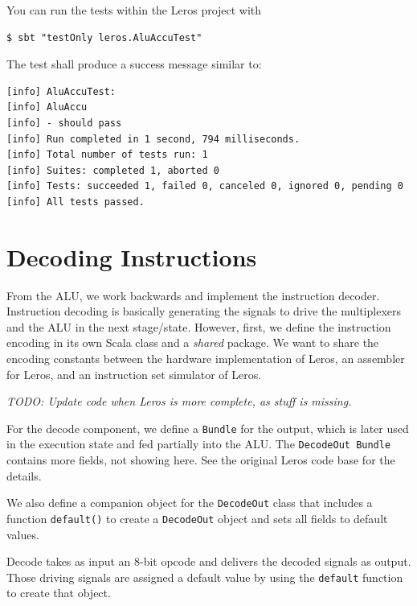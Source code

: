 \documentclass[%
    10pt,
    headinclude, footexclude,
    openright, %
    notitlepage,
    cleardoubleempty,
    headsepline,
    pointlessnumbers,
    bibtotoc, idxtotoc,
    ]{scrbook}
\newcommand{\code}[1]{{\lstinline[basicstyle=\small\ttfamily]{#1}}}
\newcommand{\todo}[1]{{\emph{TODO: #1}}}
\begin{document}

\noindent You can run the tests within the Leros project with

\begin{verbatim}
$ sbt "testOnly leros.AluAccuTest"
\end{verbatim}

The test shall produce a success message similar to:

\begin{verbatim}
[info] AluAccuTest:
[info] AluAccu
[info] - should pass
[info] Run completed in 1 second, 794 milliseconds.
[info] Total number of tests run: 1
[info] Suites: completed 1, aborted 0
[info] Tests: succeeded 1, failed 0, canceled 0, ignored 0, pending 0
[info] All tests passed.
\end{verbatim}

\section{Decoding Instructions}


From the ALU, we work backwards and implement the instruction decoder.
Instruction decoding is basically generating the signals to drive the multiplexers
and the ALU in the next stage/state.
However, first, we define the instruction encoding in its own Scala class and
a \emph{shared} package. We want to share the encoding constants between
the hardware implementation of Leros, an assembler for Leros, and an instruction
set simulator of Leros.


\todo{Update code when Leros is more complete, as stuff is missing.}

\noindent For the decode component, we define a \code{Bundle} for the output,
which is later used in the execution state and fed partially into the ALU.
The \code{DecodeOut Bundle} contains more fields,
not showing here. See the original Leros code base for the details.


\noindent We also define a companion object for the \code{DecodeOut} class that includes a
function \code{default()} to create a \code{DecodeOut} object and sets all fields to
default values.
 

\noindent Decode takes as input an 8-bit opcode and delivers the decoded signals
as output. Those driving signals are assigned a default value by using the \code{default}
function to create that object.
\end{document}
